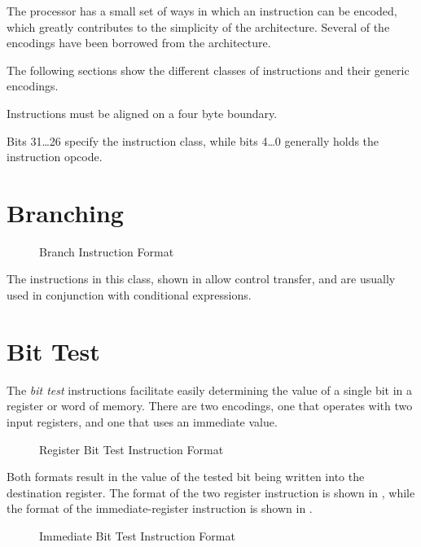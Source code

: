 
The processor has a small set of ways in which an instruction can be
encoded, which greatly contributes to the simplicity of the
architecture.  Several of the encodings have been borrowed from the
\mips architecture.

The following sections show the different classes of instructions and
their generic encodings.

Instructions must be aligned on a four byte boundary.

Bits 31\dots26 specify the instruction class, while bits 4\dots0
generally holds the instruction opcode.

\section{Branching}

\begin{figure}[h!]
  \centering
    \usebox{\jumptypebox}
    \caption{Branch Instruction Format}
    \label{fig:branching-format}
\end{figure}

The instructions in this class, shown in 
allow control transfer, and are usually used in conjunction with
conditional expressions.


\section{Bit Test}
The \emph{bit test} instructions facilitate easily determining the
value of a single bit in a register or word of memory.  There are two
encodings, one that operates with two input registers, and one that
uses an immediate value.

\begin{figure}[h]
  \centering
   \usebox{\bttypebox}
  \caption{Register Bit Test Instruction Format}
  \label{fig:bit-test-format}
\end{figure}

Both formats result in the value of the tested bit being written into
the destination register.  The format of the two register instruction
is shown in , while the format of the
immediate-register instruction is shown in
.

\begin{figure}[h]
  \centering
   \usebox{\bttypebox}
  \caption{Immediate Bit Test Instruction Format}
  \label{fig:bit-test-immediate-format}
\end{figure}

